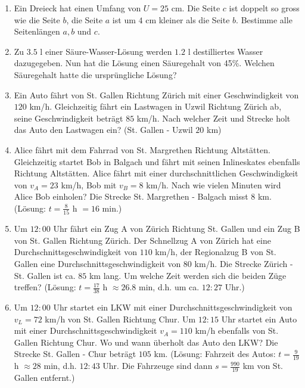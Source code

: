 \documentclass[11pt,oneside]{article}
\begin{document}
	\begin{aufgabe}
		\begin{enumerate}[label=\alph*)]
			\item Ein Dreieck hat einen Umfang von $U=25$ cm. Die Seite $c$ ist doppelt so gross wie die
			Seite $b$, die Seite $a$ ist um $4$ cm kleiner als die Seite $b$. Bestimme alle Seitenlängen $a,b$ und $c$.
			\item Zu $3.5$ l einer Säure-Wasser-Lösung werden $1.2$ l destilliertes Wasser dazugegeben. Nun hat die Lösung einen Säuregehalt von 45\%. Welchen Säuregehalt hatte die ursprüngliche Lösung?
			\item Ein Auto fährt von St. Gallen Richtung Zürich mit einer Geschwindigkeit von $120$ km/h. Gleichzeitig fährt ein Lastwagen in Uzwil Richtung Zürich ab, seine Geschwindigkeit beträgt $85$ km/h. Nach welcher Zeit und Strecke holt das Auto den Lastwagen ein? \newline
			(St. Gallen - Uzwil $20$ km)
			\item Alice fährt mit dem Fahrrad von St. Margrethen Richtung Altstätten. Gleichzeitig startet Bob in Balgach und fährt mit seinen Inlineskates ebenfalls Richtung Altstätten. Alice fährt mit einer durchschnittlichen Geschwindigkeit von $v_A=23$ km/h, Bob mit $v_B=8$ km/h. Nach wie vielen Minuten wird Alice Bob einholen? Die Strecke St. Margrethen - Balgach misst $8$ km.\newline
			(Lösung: $t=\frac{8}{15}$ h $= 16$ min.)
			\item Um $12:00$ Uhr fährt ein Zug A von Zürich Richtung St. Gallen und ein Zug B von St. Gallen Richtung Zürich. Der Schnellzug A von Zürich hat eine Durchschnittsgeschwindigkeit von $110$ km/h, der Regionalzug B von St. Gallen eine Durchschnittsgeschwindigkeit von $80$ km/h. Die Strecke Zürich - St. Gallen ist ca. $85$ km lang. Um welche Zeit werden sich die beiden Züge treffen?\newline
			(Lösung: $t=\frac{17}{38}$ h $\approx 26.8$ min, d.h. um ca. $12:27$ Uhr.)
			\item Um $12:00$ Uhr startet ein LKW mit einer Durchschnittsgeschwindigkeit von $v_L=72$ km/h von St. Gallen Richtung Chur. Um $12:15$ Uhr startet ein Auto mit einer Durchschnittsgeschwindigkeit $v_A=110$ km/h ebenfalls von St. Gallen Richtung Chur. Wo und wann überholt das Auto den LKW? Die Strecke St. Gallen - Chur beträgt $105$ km.\newline
			(Lösung: Fahrzeit des Autos: $t=\frac{9}{19}$ h $\approx 28$ min, d.h. $12:43$ Uhr. Die Fahrzeuge sind dann $s=\frac{990}{19}$ km von St. Gallen entfernt.)
		\end{enumerate}
	\end{aufgabe}
\end{document}
